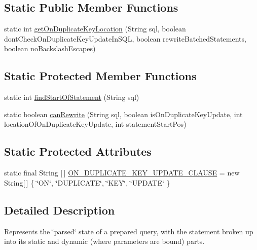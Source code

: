 \subsection*{Static Public Member Functions}
\begin{DoxyCompactItemize}
\item 
static int \mbox{\hyperlink{classcom_1_1mysql_1_1cj_1_1_parse_info_a47b69a5028ecc28f00f72b62d95003f1}{get\+On\+Duplicate\+Key\+Location}} (String sql, boolean dont\+Check\+On\+Duplicate\+Key\+Update\+In\+S\+QL, boolean rewrite\+Batched\+Statements, boolean no\+Backslash\+Escapes)
\end{DoxyCompactItemize}
\subsection*{Static Protected Member Functions}
\begin{DoxyCompactItemize}
\item 
static int \mbox{\hyperlink{classcom_1_1mysql_1_1cj_1_1_parse_info_aa47b9fbde39c657eac345e567ee07f72}{find\+Start\+Of\+Statement}} (String sql)
\item 
static boolean \mbox{\hyperlink{classcom_1_1mysql_1_1cj_1_1_parse_info_adbc42f712587fec95fff129e59deeff7}{can\+Rewrite}} (String sql, boolean is\+On\+Duplicate\+Key\+Update, int location\+Of\+On\+Duplicate\+Key\+Update, int statement\+Start\+Pos)
\end{DoxyCompactItemize}
\subsection*{Static Protected Attributes}
\begin{DoxyCompactItemize}
\item 
static final String \mbox{[}$\,$\mbox{]} \mbox{\hyperlink{classcom_1_1mysql_1_1cj_1_1_parse_info_ac230b0079c1485cf8af348a2b45fe3ae}{O\+N\+\_\+\+D\+U\+P\+L\+I\+C\+A\+T\+E\+\_\+\+K\+E\+Y\+\_\+\+U\+P\+D\+A\+T\+E\+\_\+\+C\+L\+A\+U\+SE}} = new String\mbox{[}$\,$\mbox{]} \{ \char`\"{}ON\char`\"{}, \char`\"{}D\+U\+P\+L\+I\+C\+A\+TE\char`\"{}, \char`\"{}K\+EY\char`\"{}, \char`\"{}U\+P\+D\+A\+TE\char`\"{} \}
\end{DoxyCompactItemize}


\subsection{Detailed Description}
Represents the \char`\"{}parsed\char`\"{} state of a prepared query, with the statement broken up into its static and dynamic (where parameters are bound) parts. 


